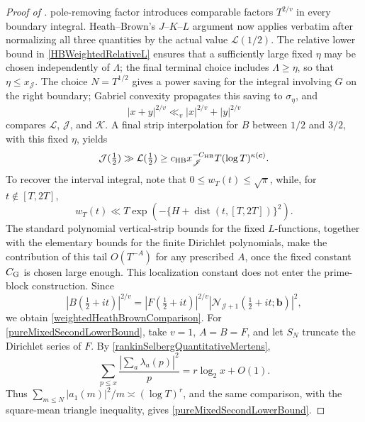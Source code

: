\documentclass[oneside, 12pt]{amsart}
\theoremstyle{definition}
\begin{document}
{\begin{proof}[Proof of ]
			pole-removing factor introduces comparable factors $T^{2/v}$ in every
			boundary integral. Heath--Brown's $J$--$K$--$L$ argument now applies
			verbatim after normalizing all three quantities by the actual value
			$\mathcal L(1/2)$.  The relative lower bound in
			\eqref{HBWeightedRelativeL} ensures that a sufficiently large fixed
			$\eta$ may be chosen independently of $\Lambda$; the final terminal
			choice includes $\Lambda\geq\eta$, so that $\eta\leq x_{\mathscr J}$.
			The choice $N=T^{1/2}$ gives a power saving for the integral involving
			$G$ on the right boundary; Gabriel convexity propagates this saving to
			$\sigma_\eta$, and
			\[
			|x+y|^{2/v}\ll_v|x|^{2/v}+|y|^{2/v}
			\]
			compares $\mathcal L$, $\mathcal J$, and $\mathcal K$.  A final strip
			interpolation for $B$ between $1/2$ and $3/2$, with this fixed $\eta$,
			yields
			\[
			\mathcal J(\tfrac12)\gg\mathcal L(\tfrac12)
			\geq c_{\rm HB}x_{\mathscr J}^{-C_{\rm HB}}
			T(\log T)^{\kappa(\boldsymbol c)}.
			\]
			To recover the interval integral, note
			that $0\leq w_T(t)\leq\sqrt\pi$, while, for
			$t\notin[T,2T]$,
			\[
			w_T(t)\ll T
			\exp\!\left(-\{H+\operatorname{dist}(t,[T,2T])\}^2\right).
			\]
			The standard polynomial vertical-strip bounds for the fixed
			$L$-functions, together with the elementary bounds for the finite
			Dirichlet polynomials, make the contribution of this tail $O(T^{-A})$
			for any prescribed $A$, once the fixed constant
			$C_{\rm G}$ is chosen large enough.  This localization constant does
			not enter the prime-block construction.  Since
			\[
			|B(\tfrac12+it)|^{2/v}
			=|F(\tfrac12+it)|^{2/v}
			|\mathcal N_{\mathscr J+1}(\tfrac12+it;\boldsymbol b)|^2,
			\]
			we obtain \eqref{weightedHeathBrownComparison}.
			For \eqref{pureMixedSecondLowerBound}, take $v=1$, $A=B=F$,
			and let $S_N$ truncate the Dirichlet series of $F$.  By
			\eqref{rankinSelbergQuantitativeMertens},
			\[
			\sum_{p\leq x}\frac{|\sum_a\lambda_a(p)|^2}{p}
			=r\log_2x+O(1).
			\]
			Thus $\sum_{m\leq N}|a_1(m)|^2/m\asymp(\log T)^r$, and the same
			comparison, with the square-mean triangle inequality, gives
			\eqref{pureMixedSecondLowerBound}.
		\end{proof}
		
}
\end{document}
